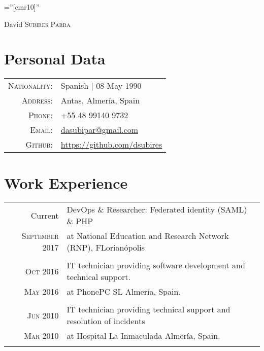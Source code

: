\documentclass[a4paper,10pt]{article}
\begin{document}
\pagestyle{empty} %

\font\fb=''[cmr10]'' %

\par{\centering
		{\Huge David \textsc{Subires Parra}
	}\bigskip\par}

\section*{Personal Data}

\begin{tabular}{rp{12cm}}
    \textsc{Nationality:} & Spanish | 08 May 1990 \\
    \textsc{Address:}     & Antas, Almería, Spain \\
    \textsc{Phone:}       & +55 48 99140 9732 \\
    \textsc{Email:}       & \href {mailto:dasubipar@gmail.com}{dasubipar@gmail.com} \\
    \textsc{Github:}      & \url{https://github.com/dsubires}
\end{tabular}

\section*{Work Experience}
\begin{tabular}{r|p{11cm}}


\textsc Current & DevOps \& Researcher: Federated identity (SAML) \& PHP
\\\textsc{September 2017} &  at National Education and Research Network (RNP), FLorianópolis  \normalsize \\\multicolumn{2}{c}{} \\



\textsc{Oct} 2016 & IT technician providing software development and technical support.\\\textsc{May 2016} & at PhonePC SL Almería, Spain. \normalsize \\\multicolumn{2}{c}{} \\


\textsc{Jun} 2010 & IT technician providing technical support and resolution of incidents\\\textsc{Mar 2010} & at Hospital La Inmaculada Almería, Spain. \normalsize \\\multicolumn{2}{c}{} \\


\end{tabular}
\end{document}
